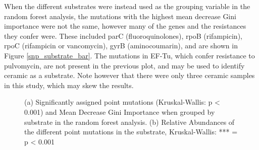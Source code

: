 When the different substrates were instead used as the grouping variable in the random forest analysis, the mutations with the highest mean decrease Gini importance were not the same, however many of the genes and the resistances they confer were. These included parC (fluoroquinolones), rpoB (rifampicin), rpoC (rifampicin or vancomycin), gyrB (aminocoumarin), and are shown in Figure \ref{snp_substrate_bar}. The mutations in EF-Tu, which confer resistance to pulvomycin, are not present in the previous plot, and may be used to identify ceramic as a substrate. Note however that there were only three ceramic samples in this study, which may skew the results.

\begin{figure}[h!]
    \centering
    \caption{(a) Significantly assigned point mutations (Kruskal-Wallis: p < 0.001) and Mean Decrease Gini Importance when grouped by substrate in the random forest analysis. (b) Relative Abundances of the different point mutations in the substrate, Kruskal-Wallis: *** = p < 0.001}
    \label{snps_substrate}
\end{figure}

